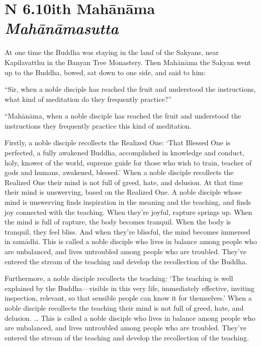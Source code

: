 \documentclass[12pt,openany]{book}%
\newcommand*{\suttatitleacronym}[1]{\smaller[2]{#1}\vspace*{.3em}}
\newcommand*{\suttatitletranslation}[1]{\linebreak{#1}}
\newcommand*{\suttatitleroot}[1]{\linebreak\smaller[2]\itshape{#1}}
\newcommand*{\tocacronym}[1]{\hspace*{-3.3em}{#1}\quad}
\newcommand*{\toctranslation}[1]{#1}
\newcommand*{\tocroot}[1]{(\textit{#1})}
\begin{document}
%
\section*{{\suttatitleacronym AN 6.10}{\suttatitletranslation With Mahānāma }{\suttatitleroot Mahānāmasutta}}
\addcontentsline{toc}{section}{\tocacronym{AN 6.10} \toctranslation{With Mahānāma } \tocroot{Mahānāmasutta}}

At one time the Buddha was staying in the land of the Sakyans, near Kapilavatthu in the Banyan Tree Monastery. Then \textsanskrit{Mahānāma} the Sakyan went up to the Buddha, bowed, sat down to one side, and said to him: 

“Sir, when a noble disciple has reached the fruit and understood the instructions, what kind of meditation do they frequently practice?” 

“\textsanskrit{Mahānāma}, when a noble disciple has reached the fruit and understood the instructions they frequently practice this kind of meditation. 

Firstly, a noble disciple recollects the Realized One: ‘That Blessed One is perfected, a fully awakened Buddha, accomplished in knowledge and conduct, holy, knower of the world, supreme guide for those who wish to train, teacher of gods and humans, awakened, blessed.’ When a noble disciple recollects the Realized One their mind is not full of greed, hate, and delusion. At that time their mind is unswerving, based on the Realized One. A noble disciple whose mind is unswerving finds inspiration in the meaning and the teaching, and finds joy connected with the teaching. When they’re joyful, rapture springs up. When the mind is full of rapture, the body becomes tranquil. When the body is tranquil, they feel bliss. And when they’re blissful, the mind becomes immersed in \textsanskrit{samādhi}. This is called a noble disciple who lives in balance among people who are unbalanced, and lives untroubled among people who are troubled. They’ve entered the stream of the teaching and develop the recollection of the Buddha. 

Furthermore, a noble disciple recollects the teaching: ‘The teaching is well explained by the Buddha—visible in this very life, immediately effective, inviting inspection, relevant, so that sensible people can know it for themselves.’ When a noble disciple recollects the teaching their mind is not full of greed, hate, and delusion. … This is called a noble disciple who lives in balance among people who are unbalanced, and lives untroubled among people who are troubled. They’ve entered the stream of the teaching and develop the recollection of the teaching. 
\end{document}

